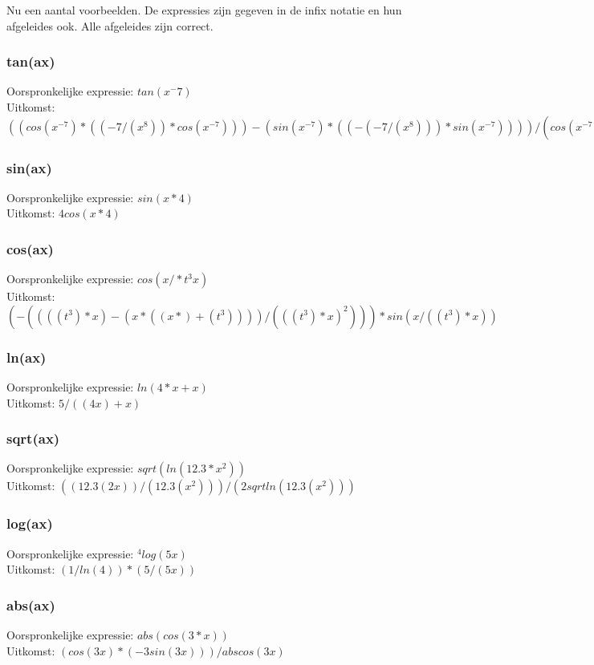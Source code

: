 \documentclass[a4paper,10pt]{article}
\begin{document}
\noindent Nu een aantal voorbeelden. De expressies zijn gegeven in de infix notatie en hun afgeleides ook.
Alle afgeleides zijn correct.

\subsubsection*{tan(ax)}
Oorspronkelijke expressie: $tan(x ^ -7)$ \\
Uitkomst: $((cos(x^{-7})*((-7/(x^8))*cos(x^{-7})))-(sin(x^{-7})*((-(-7/(x^8)))*sin(x^{-7}))))/(cos(x^{-7})^2)$

\subsubsection*{sin(ax)}
Oorspronkelijke expressie: $sin(x * 4)$ \\
Uitkomst: $4cos(x*4)$

\subsubsection*{cos(ax)}
Oorspronkelijke expressie: $cos(x / * t ^ 3 x)$ \\
Uitkomst: $(-((((t^3)*x)-(x*((x*)+(t^3))))/(((t^3)*x)^2)))*sin(x/((t^3)*x))$

\subsubsection*{ln(ax)}
Oorspronkelijke expressie: $ln(4 * x + x)$ \\
Uitkomst: $5/((4x)+x)$

\subsubsection*{sqrt(ax)}
Oorspronkelijke expressie: $sqrt(ln(12.3 * x ^ 2))$ \\
Uitkomst: $((12.3(2x))/(12.3(x^2)))/(2sqrtln(12.3(x^2)))$

\subsubsection*{log(ax)}
Oorspronkelijke expressie: $^{4}log(5x)$ \\
Uitkomst: $(1/ln(4))*(5/(5x))$

\subsubsection*{abs(ax)}
Oorspronkelijke expressie: $abs(cos( 3 * x))$ \\
Uitkomst: $(cos(3x)*(-3sin(3x)))/abscos(3x)$
\end{document}
